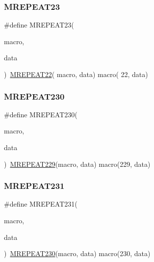 \mbox{\label{group__group__sam0__utils__mrepeat_gadd71c28e883bbbf5f033d518e35b230d}} 
\subsubsection{\texorpdfstring{MREPEAT23}{MREPEAT23}}
{\footnotesize\ttfamily \#define M\+R\+E\+P\+E\+A\+T23(\begin{DoxyParamCaption}\item[{}]{macro,  }\item[{}]{data }\end{DoxyParamCaption})~\mbox{\hyperlink{group__group__sam0__utils__mrepeat_ga9ac17b91b98d21f0fdbfc1f4739fe0ed}{M\+R\+E\+P\+E\+A\+T22}}( macro, data)   macro( 22, data)}

\mbox{\label{group__group__sam0__utils__mrepeat_ga4e98b44455fc8c2a542de807ef8f2535}} 
\subsubsection{\texorpdfstring{MREPEAT230}{MREPEAT230}}
{\footnotesize\ttfamily \#define M\+R\+E\+P\+E\+A\+T230(\begin{DoxyParamCaption}\item[{}]{macro,  }\item[{}]{data }\end{DoxyParamCaption})~\mbox{\hyperlink{group__group__sam0__utils__mrepeat_ga0f5e93e8a648f55e0d193221c016771a}{M\+R\+E\+P\+E\+A\+T229}}(macro, data)   macro(229, data)}

\mbox{\label{group__group__sam0__utils__mrepeat_ga3f6882a8daac99c9571e37fd306c5451}} 
\subsubsection{\texorpdfstring{MREPEAT231}{MREPEAT231}}
{\footnotesize\ttfamily \#define M\+R\+E\+P\+E\+A\+T231(\begin{DoxyParamCaption}\item[{}]{macro,  }\item[{}]{data }\end{DoxyParamCaption})~\mbox{\hyperlink{group__group__sam0__utils__mrepeat_ga4e98b44455fc8c2a542de807ef8f2535}{M\+R\+E\+P\+E\+A\+T230}}(macro, data)   macro(230, data)}

